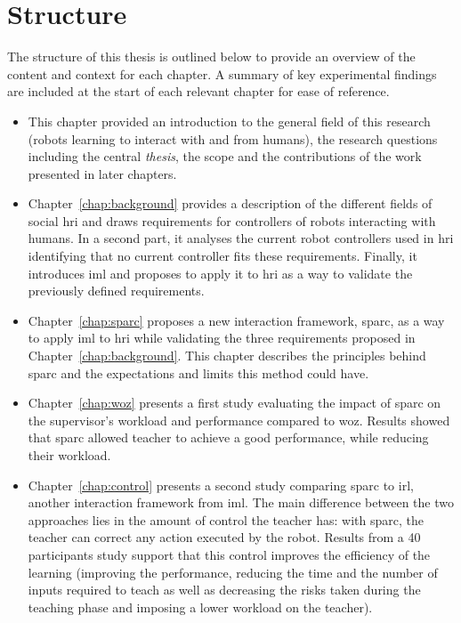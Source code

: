 \section{Structure}\label{sec:intro_struct}
The structure of this thesis is outlined below to provide an overview of the content and context for each chapter. A summary of key experimental findings are included at the start of each relevant chapter for ease of reference. 

\begin{itemize}
	\item This chapter provided an introduction to the general field of this research (robots learning to interact with and from humans), the research questions including the central \emph{thesis}, the scope and the contributions of the work presented in later chapters.  

	\item Chapter~\ref{chap:background} provides a description of the different fields of social \gls{hri} and draws requirements for controllers of robots interacting with humans. In a second part, it analyses the current robot controllers used in \gls{hri} identifying that no current controller fits these requirements. Finally, it introduces \gls{iml} and proposes to apply it to \gls{hri} as a way to validate the previously defined requirements.
	
	\item Chapter~\ref{chap:sparc} proposes a new interaction framework, \gls{sparc}, as a way to apply \gls{iml} to \gls{hri} while validating the three requirements proposed in Chapter~\ref{chap:background}. This chapter describes the principles behind \gls{sparc} and the expectations and limits this method could have.
	
	\item Chapter~\ref{chap:woz} presents a first study evaluating the impact of \gls{sparc} on the supervisor's workload and performance compared to \gls{woz}. Results showed that \gls{sparc} allowed teacher to achieve a good performance, while reducing their workload.
	
	\item Chapter~\ref{chap:control} presents a second study comparing \gls{sparc} to \gls{irl}, another interaction framework from \gls{iml}. The main difference between the two approaches lies in the amount of control the teacher has: with \gls{sparc}, the teacher can correct any action executed by the robot. Results from a 40 participants study support that this control improves the efficiency of the learning (improving the performance, reducing the time and the number of inputs required to teach as well as decreasing the risks taken during the teaching phase and imposing a lower workload on the teacher).
	

\end{itemize}
